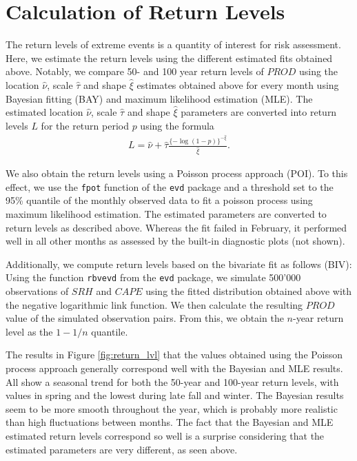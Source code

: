 \documentclass[10pt,conference,compsocconf]{IEEEtran}
\begin{document}
\section*{Calculation of Return Levels}
The return levels of extreme events is a quantity of interest for risk assessment. Here, we estimate the return levels using the different estimated fits obtained above. Notably, we compare 50- and 100 year return levels of $PROD$ using the location $\hat{\nu}$, scale $\hat{\tau}$ and shape $\hat{\xi}$ estimates obtained above for every month using Bayesian fitting (BAY) and maximum likelihood estimation (MLE). The estimated location $\hat{\nu}$, scale $\hat{\tau}$ and shape $\hat{\xi}$ parameters are converted into return levels $L$ for the return period $p$ using the formula
\begin{align*}
	L = \hat{\nu} + \hat{\tau}  \frac{\{-\log(1-p)\}^{-\hat{\xi}}}{\hat{\xi}}.
\end{align*}
\par
We also obtain the return levels using a Poisson process approach (POI). To this effect, we use the \texttt{fpot} function of the \texttt{evd} package and a threshold set to the 95\% quantile of the monthly observed data to fit a poisson process using maximum likelihood estimation. The estimated parameters are converted to return levels as described above. Whereas the fit failed in February, it performed well in all other months as assessed by the built-in diagnostic plots (not shown). %
\par
Additionally, we compute return levels based on the bivariate fit as follows (BIV): Using the function \texttt{rbvevd} from the \texttt{evd} package, we simulate 500'000 observations of $SRH$ and $CAPE$ using the fitted distribution obtained above with the negative logarithmic link function. We then calculate the resulting $PROD$ value of the simulated observation pairs. From this, we obtain the $n$-year return level as the $1-1/n$ quantile. 
\par
The results in Figure \ref{fig:return_lvl} that the values obtained using the Poisson process approach generally correspond well with the Bayesian and MLE results. All show a seasonal trend for both the 50-year and 100-year return levels, with values in spring and the lowest during late fall and winter. The Bayesian results seem to be more smooth throughout the year, which is probably more realistic than high fluctuations between months. The fact that the Bayesian and MLE estimated return levels correspond so well is a surprise considering that the estimated parameters are very different, as seen above. 
\end{document}

